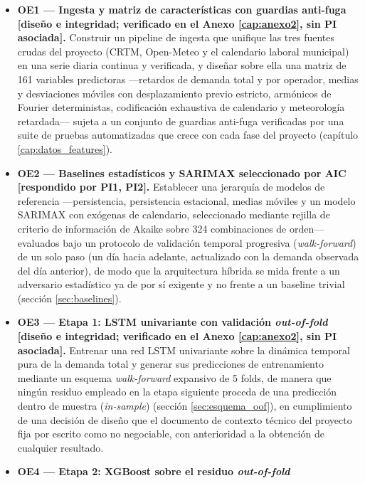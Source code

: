 \begin{itemize}
  \item \textbf{OE1 — Ingesta y matriz de características con guardias anti-fuga
    \textnormal{[diseño e integridad; verificado en el Anexo \ref{cap:anexo2}, sin PI
    asociada]}.} Construir un pipeline de ingesta que unifique las tres fuentes
    crudas del proyecto (CRTM, Open-Meteo y el calendario laboral municipal) en una
    serie diaria continua y verificada, y diseñar sobre ella una matriz de 161
    variables predictoras —retardos de demanda total y por operador, medias y
    desviaciones móviles con desplazamiento previo estricto, armónicos de Fourier
    deterministas, codificación exhaustiva de calendario y meteorología retardada—
    sujeta a un conjunto de guardias anti-fuga verificadas por una suite de pruebas automatizadas que
    crece con cada fase del proyecto (capítulo \ref{cap:datos_features}).
  \item \textbf{OE2 — Baselines estadísticos y SARIMAX seleccionado por AIC
    \textnormal{[respondido por PI1, PI2]}.}
    Establecer una jerarquía de modelos de referencia —persistencia, persistencia
    estacional, medias móviles y un modelo SARIMAX con exógenas de calendario,
    seleccionado mediante rejilla de criterio de información de Akaike sobre 324
    combinaciones de orden— evaluados bajo un protocolo de validación temporal
    progresiva (\emph{walk-forward}) de un solo paso (un día hacia adelante, actualizado con la
    demanda observada del día anterior), de modo que la arquitectura híbrida se mida
    frente a un adversario estadístico ya de por sí exigente y no frente a un baseline
    trivial (sección \ref{sec:baselines}).
  \item \textbf{OE3 — Etapa 1: LSTM univariante con validación \emph{out-of-fold}
    \textnormal{[diseño e integridad; verificado en el Anexo \ref{cap:anexo2}, sin PI
    asociada]}.}
    Entrenar una red LSTM univariante sobre la dinámica temporal pura de la demanda
    total y generar sus predicciones de entrenamiento mediante un esquema
    \emph{walk-forward} expansivo de 5 folds, de manera que ningún residuo empleado
    en la etapa siguiente proceda de una predicción dentro de muestra (\emph{in-sample}) (sección
    \ref{sec:esquema_oof}), en cumplimiento de una decisión de diseño que el
    documento de contexto técnico del proyecto fija por escrito como no negociable,
    con anterioridad a la obtención de cualquier resultado.
  \item \textbf{OE4 — Etapa 2: XGBoost sobre el residuo \emph{out-of-fold}
}
\end{itemize}

